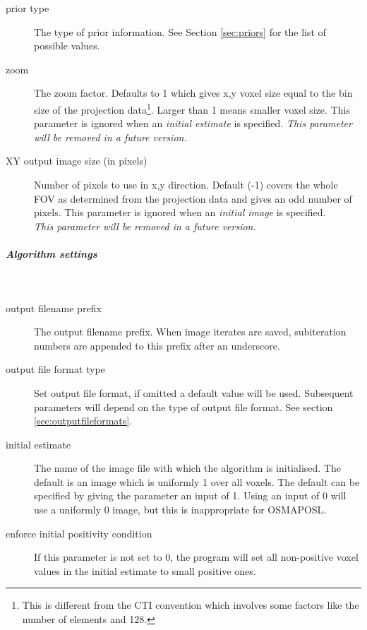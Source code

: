 \documentclass{article}
\newcommand{\subsubsubsubsection}[1]{\subparagraph{#1} \mbox{} \\}
\begin{document}
{\begin{description}
\item[prior type]
The type of prior information. See Section \ref{sec:priors} for the list 
of possible values.

\item[zoom]
The zoom factor. Defaults to 1 which gives x,y voxel size equal 
to the bin size of the projection data\footnote{{\small This is different 
from the CTI convention which involves some factors like the 
number of elements and 128.}}. Larger than 1 means smaller voxel 
size. This parameter is ignored when an \textit{initial estimate} is specified.
\textit{This parameter will be removed in a future version.}

\item[XY output image size (in pixels)]
Number of pixels to use in x,y direction. Default (-1) covers 
the whole FOV as determined from the projection data and gives 
an odd number of pixels. This parameter is ignored when an \textit{initial 
image} is specified. \\
\textit{This parameter will be removed in a future version.}

\end{description}


{ \subsubsubsubsection{Algorithm settings}
}
\label{sec:IterativeReconSettings}
\begin{description}

\item[output filename prefix]
 The output filename prefix. When image iterates are saved, subiteration 
numbers are appended to this prefix after an underscore.

\item[output file format type]
Set output file format, if omitted a default value will be used. 
Subsequent parameters will depend on the type of output file 
format. See section \ref{sec:outputfileformats}.


\item[initial estimate]
The name of the image file with which the algorithm is initialised. 
The default is an image which is uniformly 1 over all voxels. 
The default can be specified by giving the parameter an input 
of 1. Using an input of 0 will use a uniformly 0 image, but this 
is inappropriate for OSMAPOSL.


\item[enforce initial positivity condition]
If this parameter is not set to 0, the program will set all non-positive 
voxel values in the initial estimate to small positive ones.



\end{description}}
\end{document}
